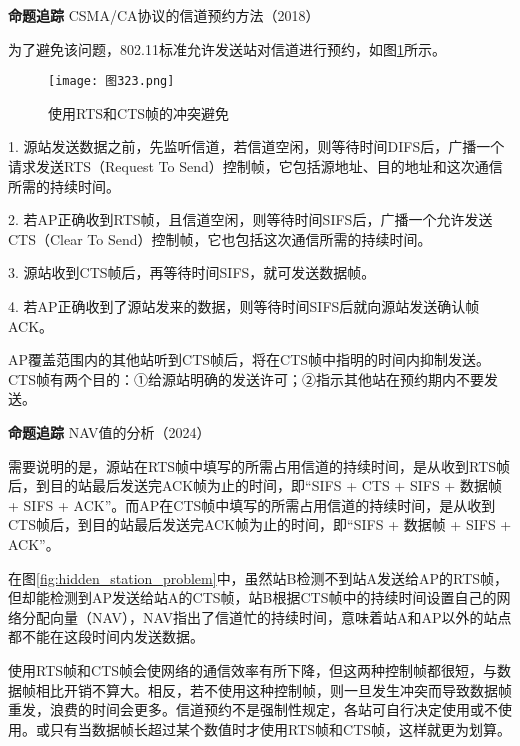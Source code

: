 \documentclass{ctexbook}
\begin{document}
	\begin{tcolorbox}[colframe=black, colback=white]
		\kaishu \textbf{命题追踪} \quad CSMA/CA协议的信道预约方法（2018）
	\end{tcolorbox}
	
	为了避免该问题，802.11标准允许发送站对信道进行预约，如图\ref{fig:rts_cts_mechanism}所示。
	
	\begin{figure}[h]
		\centering
		\caption{使用RTS和CTS帧的冲突避免}
		\label{fig:rts_cts_mechanism}
		\texttt{[image: 图323.png]} %
	\end{figure}
	
	1. 源站发送数据之前，先监听信道，若信道空闲，则等待时间DIFS后，广播一个请求发送RTS（Request To Send）控制帧，它包括源地址、目的地址和这次通信所需的持续时间。
	
	2. 若AP正确收到RTS帧，且信道空闲，则等待时间SIFS后，广播一个允许发送CTS（Clear To Send）控制帧，它也包括这次通信所需的持续时间。

	3. 源站收到CTS帧后，再等待时间SIFS，就可发送数据帧。

	4. 若AP正确收到了源站发来的数据，则等待时间SIFS后就向源站发送确认帧ACK。
	
	AP覆盖范围内的其他站听到CTS帧后，将在CTS帧中指明的时间内抑制发送。CTS帧有两个目的：①给源站明确的发送许可；②指示其他站在预约期内不要发送。
	
	\begin{tcolorbox}[colframe=black, colback=white]
		\kaishu \textbf{命题追踪} \quad NAV值的分析（2024）
	\end{tcolorbox}
	
	需要说明的是，源站在RTS帧中填写的所需占用信道的持续时间，是从收到RTS帧后，到目的站最后发送完ACK帧为止的时间，即“SIFS + CTS + SIFS + 数据帧 + SIFS + ACK”。而AP在CTS帧中填写的所需占用信道的持续时间，是从收到CTS帧后，到目的站最后发送完ACK帧为止的时间，即“SIFS + 数据帧 + SIFS + ACK”。
	
	在图\ref{fig:hidden_station_problem}中，虽然站B检测不到站A发送给AP的RTS帧，但却能检测到AP发送给站A的CTS帧，站B根据CTS帧中的持续时间设置自己的网络分配向量（NAV），NAV指出了信道忙的持续时间，意味着站A和AP以外的站点都不能在这段时间内发送数据。
	
	使用RTS帧和CTS帧会使网络的通信效率有所下降，但这两种控制帧都很短，与数据帧相比开销不算大。相反，若不使用这种控制帧，则一旦发生冲突而导致数据帧重发，浪费的时间会更多。信道预约不是强制性规定，各站可自行决定使用或不使用。或只有当数据帧长超过某个数值时才使用RTS帧和CTS帧，这样就更为划算。
	
\end{document}
